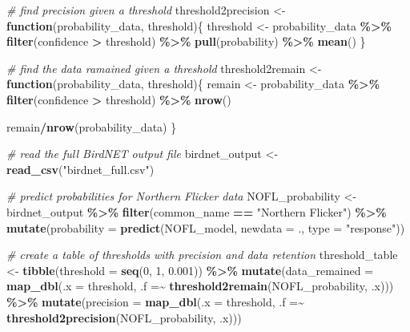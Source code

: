 \documentclass[
]{article}
\newenvironment{Shaded}{\begin{snugshade}}{\end{snugshade}}
\newcommand{\AttributeTok}[1]{\textcolor[rgb]{0.13,0.29,0.53}{#1}}
\newcommand{\CommentTok}[1]{\textcolor[rgb]{0.56,0.35,0.01}{\textit{#1}}}
\newcommand{\ControlFlowTok}[1]{\textcolor[rgb]{0.13,0.29,0.53}{\textbf{#1}}}
\newcommand{\DecValTok}[1]{\textcolor[rgb]{0.00,0.00,0.81}{#1}}
\newcommand{\FloatTok}[1]{\textcolor[rgb]{0.00,0.00,0.81}{#1}}
\newcommand{\FunctionTok}[1]{\textcolor[rgb]{0.13,0.29,0.53}{\textbf{#1}}}
\newcommand{\NormalTok}[1]{#1}
\newcommand{\OtherTok}[1]{\textcolor[rgb]{0.56,0.35,0.01}{#1}}
\newcommand{\SpecialCharTok}[1]{\textcolor[rgb]{0.81,0.36,0.00}{\textbf{#1}}}
\newcommand{\StringTok}[1]{\textcolor[rgb]{0.31,0.60,0.02}{#1}}
\begin{document}
\begin{Shaded}
\begin{Highlighting}[]
\CommentTok{\# find precision given a threshold}
\NormalTok{threshold2precision }\OtherTok{\textless{}{-}} \ControlFlowTok{function}\NormalTok{(probability\_data, threshold)\{}
\NormalTok{  threshold }\OtherTok{\textless{}{-}}\NormalTok{ probability\_data }\SpecialCharTok{\%\textgreater{}\%}
    \FunctionTok{filter}\NormalTok{(confidence }\SpecialCharTok{\textgreater{}}\NormalTok{ threshold) }\SpecialCharTok{\%\textgreater{}\%}
    \FunctionTok{pull}\NormalTok{(probability) }\SpecialCharTok{\%\textgreater{}\%}
    \FunctionTok{mean}\NormalTok{()}
\NormalTok{\}}


\CommentTok{\# find the data ramained given a threshold}
\NormalTok{threshold2remain }\OtherTok{\textless{}{-}} \ControlFlowTok{function}\NormalTok{(probability\_data, threshold)\{}
\NormalTok{  remain }\OtherTok{\textless{}{-}}\NormalTok{ probability\_data }\SpecialCharTok{\%\textgreater{}\%}
    \FunctionTok{filter}\NormalTok{(confidence }\SpecialCharTok{\textgreater{}}\NormalTok{ threshold) }\SpecialCharTok{\%\textgreater{}\%}
    \FunctionTok{nrow}\NormalTok{()}
  
\NormalTok{  remain}\SpecialCharTok{/}\FunctionTok{nrow}\NormalTok{(probability\_data)}
\NormalTok{\}}


\CommentTok{\# read the full BirdNET output file}
\NormalTok{birdnet\_output }\OtherTok{\textless{}{-}} \FunctionTok{read\_csv}\NormalTok{(}\StringTok{"birdnet\_full.csv"}\NormalTok{)}

\CommentTok{\# predict probabilities for Northern Flicker data}
\NormalTok{NOFL\_probability }\OtherTok{\textless{}{-}}\NormalTok{ birdnet\_output }\SpecialCharTok{\%\textgreater{}\%}
  \FunctionTok{filter}\NormalTok{(common\_name }\SpecialCharTok{==} \StringTok{"Northern Flicker"}\NormalTok{) }\SpecialCharTok{\%\textgreater{}\%}
  \FunctionTok{mutate}\NormalTok{(}\AttributeTok{probability =} \FunctionTok{predict}\NormalTok{(NOFL\_model, }\AttributeTok{newdata =}\NormalTok{ ., }\AttributeTok{type =} \StringTok{"response"}\NormalTok{)) }

\CommentTok{\# create a table of thresholds with precision and data retention}
\NormalTok{threshold\_table }\OtherTok{\textless{}{-}} \FunctionTok{tibble}\NormalTok{(}\AttributeTok{threshold =} \FunctionTok{seq}\NormalTok{(}\DecValTok{0}\NormalTok{, }\DecValTok{1}\NormalTok{, }\FloatTok{0.001}\NormalTok{)) }\SpecialCharTok{\%\textgreater{}\%}
  \FunctionTok{mutate}\NormalTok{(}\AttributeTok{data\_remained =} \FunctionTok{map\_dbl}\NormalTok{(}\AttributeTok{.x =}\NormalTok{ threshold, }
                                 \AttributeTok{.f =}\SpecialCharTok{\textasciitilde{}} \FunctionTok{threshold2remain}\NormalTok{(NOFL\_probability, .x))) }\SpecialCharTok{\%\textgreater{}\%}
  \FunctionTok{mutate}\NormalTok{(}\AttributeTok{precision =} \FunctionTok{map\_dbl}\NormalTok{(}\AttributeTok{.x =}\NormalTok{ threshold, }
                             \AttributeTok{.f =}\SpecialCharTok{\textasciitilde{}} \FunctionTok{threshold2precision}\NormalTok{(NOFL\_probability, .x)))}
\end{Highlighting}
\end{Shaded}
\end{document}
